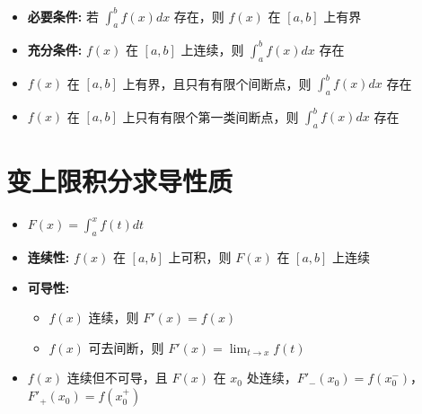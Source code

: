 \documentclass[10pt]{article}
\begin{document}
\begin{multicols*}{2}
\begin{itemize}
  \item \textbf{必要条件:} 若 \(\int_a^b f(x)dx\) 存在，则 \(f(x)\) 在 \([a,b]\) 上有界
  \item \textbf{充分条件:} \(f(x)\) 在 \([a,b]\) 上连续，则 \(\int_a^b f(x)dx\) 存在
  \item \(f(x)\) 在 \([a,b]\) 上有界，且只有有限个间断点，则 \(\int_a^b f(x)dx\) 存在
  \item \(f(x)\) 在 \([a,b]\) 上只有有限个第一类间断点，则 \(\int_a^b f(x)dx\) 存在
\end{itemize}

\section*{变上限积分求导性质}
\vspace{-8pt}

\begin{itemize}
  \item \(F(x) = \int_a^x f(t)dt\)
  \item \textbf{连续性:} \(f(x)\) 在 \([a,b]\) 上可积，则 \(F(x)\) 在 \([a,b]\) 上连续
  \item \textbf{可导性:}
    \begin{itemize}
      \item \(f(x)\) 连续，则 \(F'(x) = f(x)\)
      \item \(f(x)\) 可去间断，则 \(F'(x) = \lim_{t \to x} f(t)\)
    \end{itemize}
  \item \(f(x)\) 连续但不可导，且 \(F(x)\) 在 \(x_0\) 处连续，\(F'_-(x_0) = f(x_0^-)\)，\(F'_+(x_0) = f(x_0^+)\)
\end{itemize}


\end{multicols*}
\end{document}
